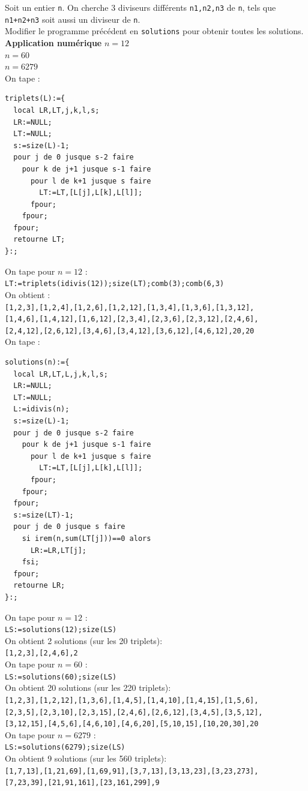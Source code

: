 \documentclass[a4paper,11pt]{book}
\begin{document}
Soit un entier {\tt n}. On cherche 3 diviseurs diff\'erents {\tt n1,n2,n3} de 
{\tt n}, tels que {\tt n1+n2+n3} soit aussi un diviseur de {\tt n}.\\
Modifier le programme pr\'ec\'edent en {\tt solutions} pour obtenir toutes les 
solutions.\\
{\bf Application num\'erique}
$n=12$\\
$n=60$\\
$n=6279$\\
On tape :
\begin{verbatim}
triplets(L):={
  local LR,LT,j,k,l,s;
  LR:=NULL;
  LT:=NULL;
  s:=size(L)-1;
  pour j de 0 jusque s-2 faire
    pour k de j+1 jusque s-1 faire
      pour l de k+1 jusque s faire
        LT:=LT,[L[j],L[k],L[l]];
      fpour;
    fpour;
  fpour;
  retourne LT;
}:;
\end{verbatim}
On tape pour $n=12$ :\\
{\tt LT:=triplets(idivis(12));size(LT);comb(3);comb(6,3)}\\
On obtient :\\
{\tt [1,2,3],[1,2,4],[1,2,6],[1,2,12],[1,3,4],[1,3,6],[1,3,12],}\\
{\tt [1,4,6],[1,4,12],[1,6,12],[2,3,4],[2,3,6],[2,3,12],[2,4,6],}\\
{\tt [2,4,12],[2,6,12],[3,4,6],[3,4,12],[3,6,12],[4,6,12],20,20}\\
On tape :
\begin{verbatim}
solutions(n):={
  local LR,LT,L,j,k,l,s;
  LR:=NULL;
  LT:=NULL;
  L:=idivis(n);
  s:=size(L)-1;
  pour j de 0 jusque s-2 faire
    pour k de j+1 jusque s-1 faire
      pour l de k+1 jusque s faire
        LT:=LT,[L[j],L[k],L[l]];
      fpour;
    fpour;
  fpour;
  s:=size(LT)-1;
  pour j de 0 jusque s faire
    si irem(n,sum(LT[j]))==0 alors
      LR:=LR,LT[j];
    fsi;
  fpour;
  retourne LR;
}:;
\end{verbatim}
On tape pour $n=12$ :\\
{\tt LS:=solutions(12);size(LS)}\\
On obtient 2 solutions (sur les 20 triplets):\\
{\tt [1,2,3],[2,4,6],2}\\
On tape pour $n=60$ :\\
{\tt LS:=solutions(60);size(LS)}\\
On obtient 20 solutions (sur les 220 triplets):\\
{\tt [1,2,3],[1,2,12],[1,3,6],[1,4,5],[1,4,10],[1,4,15],[1,5,6],}\\
{\tt [2,3,5],[2,3,10],[2,3,15],[2,4,6],[2,6,12],[3,4,5],[3,5,12],}\\
{\tt [3,12,15],[4,5,6],[4,6,10],[4,6,20],[5,10,15],[10,20,30],20}\\
On tape pour $n=6279$ :\\
{\tt LS:=solutions(6279);size(LS)}\\
On obtient 9 solutions (sur les 560 triplets):\\
{\tt [1,7,13],[1,21,69],[1,69,91],[3,7,13],[3,13,23],[3,23,273],}\\
{\tt [7,23,39],[21,91,161],[23,161,299],9}
\end{document}
